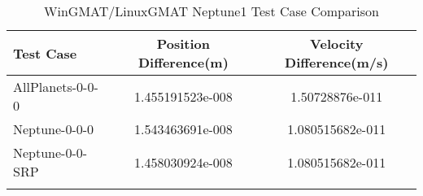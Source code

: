 \begin{table}[htbp!]
\centering
\caption{ WinGMAT/LinuxGMAT Neptune1 Test Case Comparison}
      \begin{tabular}{lcc}
      \hline\hline
          Test Case & Position Difference(m) & Velocity Difference(m/s) \\
         \hline
         AllPlanets-0-0-0 & 1.455191523e-008 & 1.50728876e-011 \\
         Neptune-0-0-0 & 1.543463691e-008 & 1.080515682e-011 \\
         Neptune-0-0-SRP & 1.458030924e-008 & 1.080515682e-011 \\
      \hline\hline
      \label{Table: Neptune1 WinGMAT-LinuxGMAT Table} 
\end{tabular}
\end{table}
